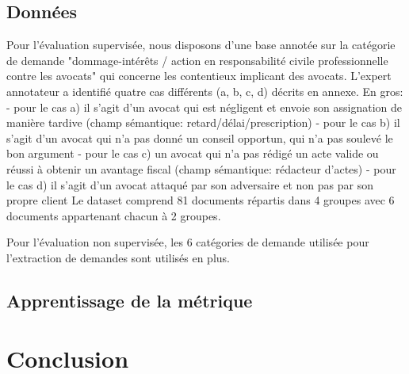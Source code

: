 \subsection{Données}
Pour l'évaluation supervisée, nous disposons d'une base annotée sur la catégorie de demande "dommage-intérêts / action en responsabilité civile professionnelle contre les avocats" qui concerne les contentieux implicant des avocats.
L'expert annotateur a identifié quatre cas différents (a, b, c, d) décrits en annexe. En gros:
- pour le cas a) il s'agit d'un avocat qui est négligent et envoie son assignation de manière tardive (champ sémantique: retard/délai/prescription)
- pour le cas b) il s'agit d'un avocat qui n'a pas donné un conseil opportun, qui n'a pas soulevé le bon argument
- pour le cas c) un avocat qui n'a pas rédigé un acte valide ou réussi à obtenir un avantage fiscal (champ sémantique: rédacteur d'actes)
- pour le cas d) il s'agit d'un avocat attaqué par son adversaire et non pas par son propre client
Le dataset comprend 81 documents répartis dans 4 groupes avec 6 documents appartenant chacun à 2 groupes.

Pour l'évaluation non supervisée, les 6 catégories de demande utilisée pour l'extraction de demandes sont utilisés en plus.

\subsection{Apprentissage de la métrique}


\section{Conclusion}
\label{sec:similarite:conclusion}